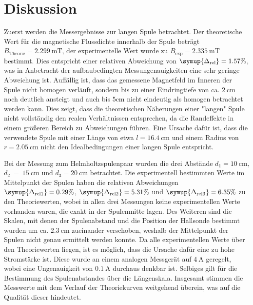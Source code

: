 \section{Diskussion}
\label{sec:Diskussion}
Zuerst werden die Messergebnisse zur langen Spule betrachtet. Der theoretische Wert für die magnetische Flussdichte innerhalb der Spule beträgt 
$B_{\text{Theorie}} = 2.299\:\unit{\milli\tesla}$, der experimentelle Wert wurde zu $B_{\text{exp}} = 2.335\:\unit{\milli\tesla}$ bestimmt. 
Dies entspricht einer relativen Abweichung von $\symup{\Delta_{\text{rel}}} = 1.57 \%$, was in Anbetracht der aufbaubedingten Messungenauigkeiten 
eine sehr geringe Abweichung ist. Auffällig ist, dass das gemessene Magnetfeld im Inneren der Spule nicht homogen verläuft, sondern bis zu einer Eindringtiefe von
ca. $2 \: \unit{\centi\metre}$ noch deutlich ansteigt und auch bis $5 \unit{\centi\metre}$ nicht eindeutig als homogen betrachtet werden kann.
Dies zeigt, dass die theoretischen Näherungen einer "langen"\: Spule nicht vollständig den realen Verhältnissen entsprechen, da die Randeffekte in einem größeren
Bereich zu Abweichungen führen. Eine Ursache dafür ist, dass die verwendete Spule mit einer Länge von etwa $l = 16.4\: \unit{\centi\metre}$ und einem Radius von 
$r = 2.05 \: \unit{\centi\metre}$ nicht den Idealbedingungen einer langen Spule entspricht.


Bei der Messung zum Helmholtzspulenpaar wurden die drei Abstände $d_1 = 10\: \unit{\centi\metre}$, $d_2~=~15\: \unit{\centi\metre}$
und $d_3 = 20\: \unit{\centi\metre}$ betrachtet. Die experimentell bestimmten Werte im Mittelpunkt der Spulen haben die relativen Abweichungen 
$\symup{\Delta_{\text{rel}1}} = 0.29 \%$, $\symup{\Delta_{\text{rel}2}} = 5.31\%$ und $\symup{\Delta_{\text{rel}3}} = 6.35 \%$ zu den Theoriewerten, wobei in allen 
drei Messungen keine experimentellen Werte vorhanden waren, die exakt in der Spulenmitte lagen. Des Weiteren sind die Skalen, mit denen der Spulenabstand und die 
Position der Hallsonde bestimmt wurden um ca. $2.3\: \unit{\centi\metre}$ zueinander verschoben, weshalb der Mittelpunkt der Spulen nicht genau ermittelt werden konnte.
Da alle experimentellen Werte über den Theoriewerten liegen, ist es möglich, dass die Ursache dafür eine zu hohe Stromstärke ist. Diese wurde an einem
analogen Messgerät auf $4 \: \unit{\ampere}$ geregelt, wobei eine Ungenauigkeit von $0.1 \: \unit{\ampere}$ durchaus denkbar ist. Selbiges gilt für die Bestimmung des
Spulenabstandes über die Längenskala. Insgesamt stimmen die Messwerte mit dem Verlauf der Theoriekurven weitgehend überein, was auf die Qualität dieser hindeutet.


